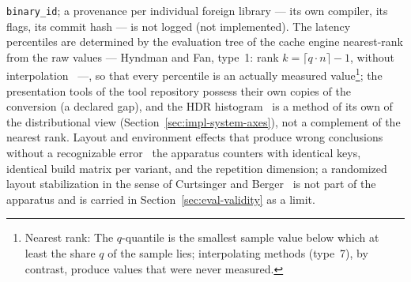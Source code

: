 \begin{nurlang}
\texttt{binary\_id}; a provenance per individual foreign library --- its own compiler, its flags, its
commit hash --- is not logged (not implemented). The latency percentiles are determined by the
evaluation tree of the cache engine nearest-rank from the raw values --- Hyndman and Fan, type~1:
rank $k = \lceil q \cdot n \rceil - 1$, without interpolation~\cite{hyndman1996quantiles} ---, so
that every percentile is an actually measured value\footnote{Nearest rank: The $q$-quantile is the
smallest sample value below which at least the share $q$ of the sample lies; interpolating methods
(type~7), by contrast, produce values that were never measured.}; the presentation tools of the tool
repository possess their own copies of the conversion (a declared gap), and the HDR
histogram~\cite{tene_hdrhistogram} is a method of its own of the distributional view
(Section~\ref{sec:impl-system-axes}), not a complement of the nearest rank. Layout and environment
effects that produce wrong conclusions without a recognizable error~\cite{mytkowicz2009wrongdata}
the apparatus counters with identical keys, identical build matrix per variant, and the repetition
dimension; a randomized layout stabilization in the sense of Curtsinger and
Berger~\cite{curtsinger2013stabilizer} is not part of the apparatus and is carried in
Section~\ref{sec:eval-validity} as a limit.
\end{nurlang}

